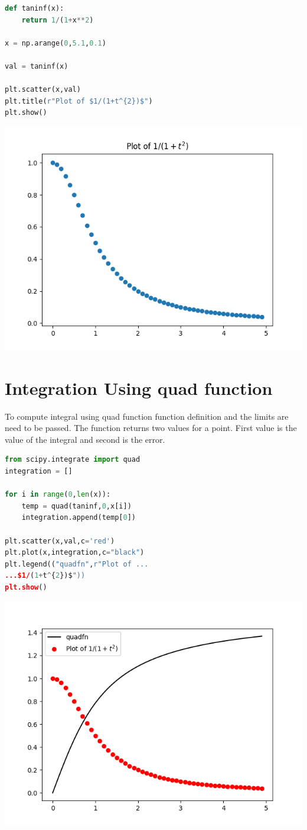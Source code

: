 \documentclass[letterpaper, 12pt]{article}
\begin{document}
\begin{multicols}{2}
\begin{lstlisting}[language=Python ,caption=To generate and plot $1/(1+t^{2})$]
def taninf(x):
	return 1/(1+x**2)

x = np.arange(0,5.1,0.1)

val = taninf(x)

plt.scatter(x,val)
plt.title(r"Plot of $1/(1+t^{2})$")
plt.show()
\end{lstlisting}
\includegraphics[width=\columnwidth]{Figure_1.png}
\section{Integration Using quad function}
To compute integral using quad function function definition and the limits are need to be passed. The function returns two values for a point. First value is the value of the integral and second is the error.
\begin{lstlisting}[language=Python , caption=Using quad function to integrate $1/(1+t^{2})$]
from scipy.integrate import quad
integration = []

for i in range(0,len(x)):
	temp = quad(taninf,0,x[i])
	integration.append(temp[0])

plt.scatter(x,val,c='red')
plt.plot(x,integration,c="black")
plt.legend(("quadfn",r"Plot of ...
...$1/(1+t^{2})$"))
plt.show()
\end{lstlisting}
\includegraphics[width=\columnwidth]{Figure_1-1.png}

\end{multicols}
\end{document}
